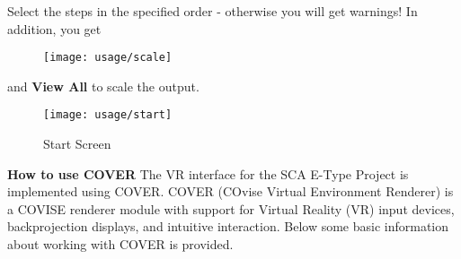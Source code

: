 Select the steps in the specified order - otherwise you will get warnings!  
\newline
\newline
In addition, you get
\newline 
\begin{figure}[!Hhtp]
   \texttt{[image: usage/scale]}
\end{figure} \newline
and {\bf View All}\newline \newline
to scale the output.

\begin{figure}[!Hhtp]
  \begin{center}
   \texttt{[image: usage/start]}
   \caption{Start Screen}
  \end{center}
\end{figure}



{\bf How to use COVER}\newline
\newline
The VR interface for the SCA E-Type Project is implemented using COVER. COVER (COvise Virtual Environment Renderer) is a COVISE renderer module
with support for Virtual Reality (VR) input devices, backprojection displays,
and intuitive interaction. Below some basic information about working with COVER
is provided.

